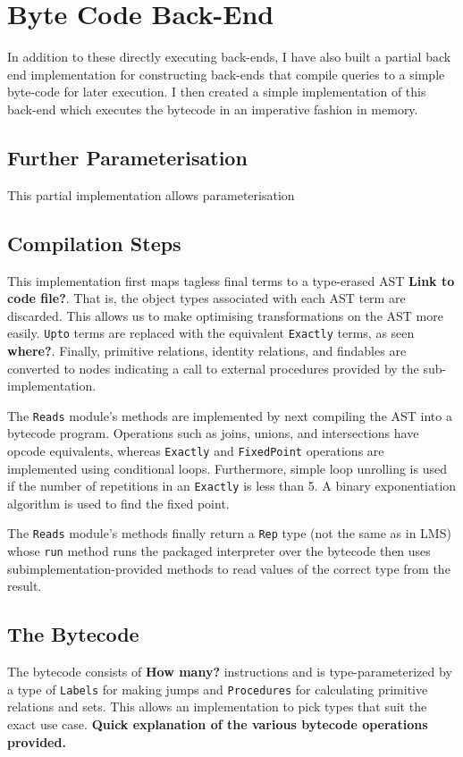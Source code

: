 \documentclass{report}
\newcommand \2[0]{\textbf{2}}
\newcommand \3[0]{\textbf{3}}
\newcommand{\todo}[1]{\textbf{#1}}
\begin{document}
\section{Byte Code Back-End}

In addition to these directly executing back-ends, I have also built a partial back end implementation for constructing back-ends that compile queries to a simple byte-code for later execution. I then created a simple implementation of this back-end which executes the bytecode in an imperative fashion in memory.

\subsection{Further Parameterisation}
This partial implementation allows parameterisation

\subsection{Compilation Steps}
This implementation first maps tagless final terms to a type-erased AST \todo{Link to code file?}. That is, the object types associated with each AST term are discarded. This allows us to make optimising transformations on the AST more easily. \texttt{Upto} terms are replaced with the equivalent \texttt{Exactly} terms, as seen \todo{where?}. Finally, primitive relations, identity relations, and findables are converted to nodes indicating a call to external procedures provided by the sub-implementation.

The \texttt{Reads} module's methods are implemented by next compiling the AST into a bytecode program. Operations such as joins, unions, and intersections have opcode equivalents, whereas \texttt{Exactly} and \texttt{FixedPoint} operations are implemented using conditional loops. Furthermore, simple loop unrolling is used if the number of repetitions in an \texttt{Exactly} is less than 5. A binary exponentiation algorithm is used to find the fixed point.

The \texttt{Reads} module's methods finally return a \texttt{Rep} type (not the same as in LMS) whose \texttt{run} method runs the packaged interpreter over the bytecode then uses subimplementation-provided methods to read values of the correct type from the result.


\subsection{The Bytecode}
The bytecode consists of \todo{How many?} instructions and is type-parameterized by a type of \texttt{Labels} for making jumps and \texttt{Procedures} for calculating primitive relations and sets. This allows an implementation to pick types that suit the exact use case.
\todo{Quick explanation of the various bytecode operations provided.}
\end{document}
